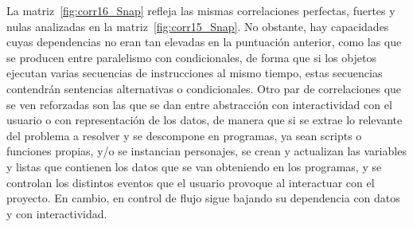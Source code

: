 \documentclass[a4paper, 12pt]{book}
\begin{document}
La matriz~\ref{fig:corr16_Snap} refleja las mismas correlaciones perfectas, fuertes y nulas analizadas en la matriz~\ref{fig:corr15_Snap}. No obstante, hay capacidades cuyas dependencias no eran tan elevadas en la puntuación anterior, como las que se producen entre paralelismo con condicionales, de forma que si los objetos ejecutan varias secuencias de instrucciones al mismo tiempo, estas secuencias contendrán sentencias alternativas o condicionales. Otro par de correlaciones que se ven reforzadas son las que se dan entre abstracción con interactividad con el usuario o con representación de los datos, de manera que si se extrae lo relevante del problema a resolver y se descompone en programas, ya sean scripts o funciones propias, y/o se instancian personajes, se crean y actualizan las variables y listas que contienen los datos que se van obteniendo en los programas, y se controlan los distintos eventos que el usuario provoque al interactuar con el proyecto. En cambio, en control de flujo sigue bajando su dependencia con datos y con interactividad. 
\end{document}
